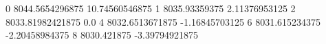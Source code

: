 0 8044.5654296875 10.74560546875
1 8035.93359375 2.11376953125
2 8033.81982421875 0.0
4 8032.6513671875 -1.16845703125
6 8031.615234375 -2.20458984375
8 8030.421875 -3.39794921875
